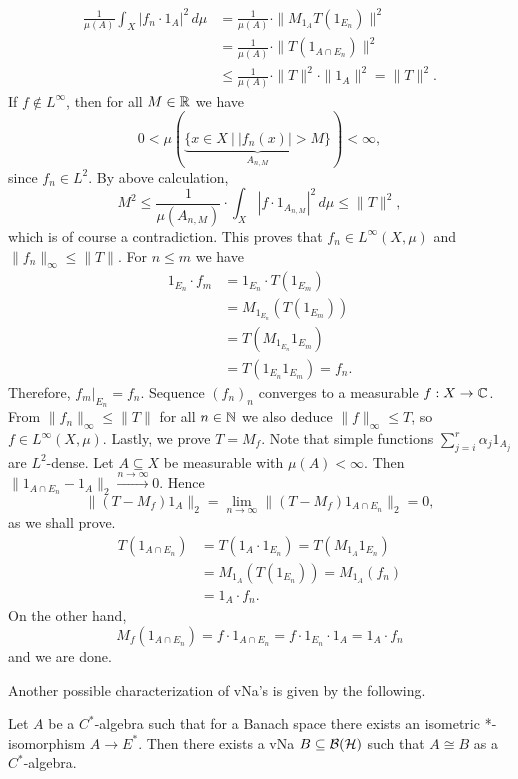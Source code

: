 \begin{myproof}
\begin{align*}
    \frac{1}{\mu(A)} \int_X |f_n \cdot 1_A|^2\, d\mu &= \frac{1}{\mu(A)} \cdot \|M_{1_A} T(1_{E_n})\|^2\\
    &= \frac{1}{\mu(A)} \cdot \| T(1_{A \cap E_n}) \|^2\\
    &\leq \frac{1}{\mu(A)} \cdot \|T\|^2 \cdot \|1_A \|^2 = \| T\|^2.
  \end{align*}
  If $f \notin L^\infty$, then for all $M \in \mathbb {R}$ we have 
  $$0 < \mu (\underbrace{\{x \in X\ |\ |f_n (x)| > M\}}_{A_{n, M}}) < \infty,$$
  since $f_n \in L^2$. By above calculation,
  $$M^2 \leq \frac{1}{\mu(A_{n, M})} \cdot \int_X |f \cdot 1_{A_{n, M}} |^2\, d\mu \leq \|T\|^2,$$
  which is of course a contradiction. This proves that $f_n \in L^\infty (X, \mu)$ and $\| f_n\|_{\infty} \leq \|T \|.$
  For $n \leq m$ we have 
  \begin{align*}
    1_{E_n} \cdot f_m &= 1_{E_n} \cdot T(1_{E_m})\\
    &= M_{1_{E_n}} (T (1_{E_m}))\\
    &= T(M_{1_{E_n}} 1_{E_m})\\
    &= T(1_{E_n} 1_{E_m}) = f_n.
  \end{align*}
  Therefore, $f_m \big|_{E_n} = f_n$. Sequence $(f_n)_n$ converges to a measurable $f: X \to \mathbb {C}$.
  From $\| f_n\|_{\infty} \leq \|T\|$ for all $n \in \mathbb {N}$ we also deduce $\|f\|_{\infty} \leq T$,
  so $f \in L^\infty (X, \mu)$. Lastly, we prove $T = M_f$.
  Note that simple functions $\sum_{j = i} ^r \alpha_j 1_{A_j}$ are $L^2$-dense.
  Let $A \subseteq X$ be measurable with $\mu(A) < \infty$.
  Then $\| 1_{A \cap E_n} - 1_A\|_2 \xrightarrow{n \to \infty} 0$.
  Hence $$\| (T - M_f) 1_A \|_2 = \lim_{n \to \infty} \| (T - M_f) 1_{A \cap E_n} \|_2 = 0,$$ as we shall prove.
  \begin{align*}
    T(1_{A \cap E_n}) &= T(1_A \cdot 1_{E_n}) = T(M_{1_A} 1_{E_n})\\
    &= M_{1_{A}} (T(1_{E_n})) = M_{1_A} (f_n)\\
    &= 1_A \cdot f_n.
  \end{align*}
  On the other hand,
  $$M_f (1_{A \cap E_n}) = f \cdot 1_{A \cap E_n} = f \cdot 1_{E_n} \cdot 1_A = 1_A \cdot f_n$$
  and we are done.
\end{myproof}


Another possible characterization of vNa's is given by the following.

\begin{theorem}[Sakai]
  Let $A$ be a $C^*$-algebra such that for a Banach space there exists an isometric *-isomorphism 
  $A \to E^*$. Then there exists a vNa $B \subseteq \operatorname{\mathcal{B} (\mathcal{H})}$ such that $A \cong B$ as a $C^*$-algebra.
\end{theorem}

